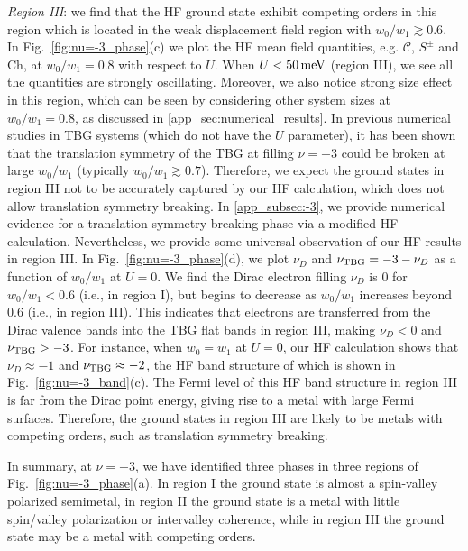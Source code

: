 \documentclass[prb,aps,nofootinbib,amssymb,twocolumn,superscriptaddress,10pt]{revtex4-2}
\begin{document}
{\it Region III}: we find that the HF ground state exhibit competing orders in this region which is located in the weak displacement field region with $w_0/w_1 \gtrsim 0.6$. In Fig.~\ref{fig:nu=-3_phase}(c) we plot the HF mean field quantities, e.g. $\mathcal{C}$, $S^\pm$ and $\mathrm{Ch}$, at $w_0/w_1 = 0.8$ with respect to $U$. When $U < 50\,\rm meV$ (region III), we see all the quantities are strongly oscillating. Moreover, we also notice strong size effect in this region, which can be seen by considering other system sizes at $w_0/w_1 = 0.8$, as discussed in \ref{app_sec:numerical_results}. In previous numerical studies in TBG systems \cite{KAN20a,SOE20,XIE20a} (which do not have the $U$ parameter), it has been shown that the translation symmetry of the TBG at filling $\nu=-3$ could be broken at large $w_0/w_1$ (typically $w_0/w_1 \gtrsim 0.7$). Therefore, we expect the ground states in region III not to be accurately captured by our HF calculation, which does not allow translation symmetry breaking. 
In \ref{app_subsec:-3}, we provide numerical evidence for a translation symmetry breaking phase via a modified HF calculation. 
Nevertheless, we provide some universal observation of our HF results in region III. In Fig.~\ref{fig:nu=-3_phase}(d), we plot $\nu_D$ and $\nu_{\rm TBG}=-3-\nu_D$ as a function of $w_0/w_1$ at $U = 0$. We find the Dirac electron filling $\nu_D$ is $0$ for $w_0/w_1<0.6$ (i.e., in region I), but begins to decrease as $w_0/w_1$ increases beyond $0.6$ (i.e., in region III). This indicates that electrons are transferred from the Dirac valence bands into the TBG flat bands in region III, making $\nu_D<0$ and $\nu_{\rm TBG}>-3$. For instance, when $w_0 = w_1$ at $U=0$, our HF calculation shows that $\nu_D \approx -1$ and $\nu_{\rm TBG} \approx -2$, the HF band structure of which is shown in Fig.~\ref{fig:nu=-3_band}(c). The Fermi level of this HF band structure in region III is far from the Dirac point energy, giving rise to a metal with large Fermi surfaces. Therefore, the ground states in region III are likely to be metals with competing orders, such as translation symmetry breaking.

In summary, at $\nu=-3$, we have identified three phases in three regions of Fig.~\ref{fig:nu=-3_phase}(a). In region I the ground state is almost a spin-valley polarized semimetal, in region II the ground state is a metal with little spin/valley polarization or intervalley coherence, while in region III the ground state may be a metal with competing orders.
\end{document}
